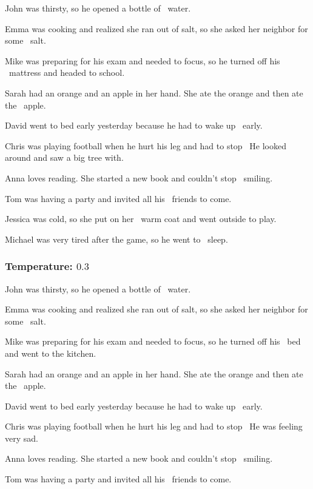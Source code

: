 \documentclass[11pt]{article}
\begin{document}
    John was thirsty, so he opened a bottle of \textellipsis\ water.

    Emma was cooking and realized she ran out of salt, so she asked her neighbor for some \textellipsis\ salt.

    Mike was preparing for his exam and needed to focus, so he turned off his \textellipsis\ mattress and headed to school.

    Sarah had an orange and an apple in her hand. She ate the orange and then ate the \textellipsis\ apple.

    David went to bed early yesterday because he had to wake up \textellipsis\ early.

    Chris was playing football when he hurt his leg and had to stop \textellipsis\  He looked around and saw a big tree with.

    Anna loves reading. She started a new book and couldn't stop \textellipsis\ smiling.

    Tom was having a party and invited all his \textellipsis\ friends to come.

    Jessica was cold, so she put on her \textellipsis\ warm coat and went outside to play.

    Michael was very tired after the game, so he went to \textellipsis\ sleep.

    \subsubsection*{Temperature: $0.3$}

    John was thirsty, so he opened a bottle of \textellipsis\ water.

    Emma was cooking and realized she ran out of salt, so she asked her neighbor for some \textellipsis\ salt.

    Mike was preparing for his exam and needed to focus, so he turned off his \textellipsis\ bed and went to the kitchen.

    Sarah had an orange and an apple in her hand. She ate the orange and then ate the \textellipsis\ apple.

    David went to bed early yesterday because he had to wake up \textellipsis\ early.

    Chris was playing football when he hurt his leg and had to stop \textellipsis\  He was feeling very sad.

    Anna loves reading. She started a new book and couldn't stop \textellipsis\ smiling.

    Tom was having a party and invited all his \textellipsis\ friends to come.
\end{document}

